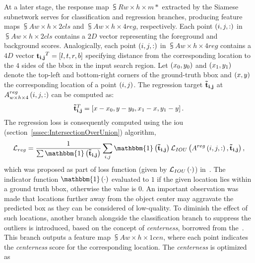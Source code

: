 At a later stage, the response map $\subsup{R}{w \times h \times m}{*}$ extracted by the Siamese subnetwork serves for classification and regression branches, producing feature maps $\subsup{A}{w \times h \times 2}{cls}$ and $\subsup{A}{w \times h \times 4}{reg}$, respectively. Each point $\left( {i, j, :} \right)$ in $\subsup{A}{w \times h \times 2}{cls}$ contains a $2D$ vector representing the foreground and background scores. Analogically, each point $\left( {i, j, :} \right)$ in $\subsup{A}{w \times h \times 4}{reg}$ contains a $4D$ vector ${\mathbf{t_{i, j}}}^T = \left[ {l, t, r, b} \right]$ specifying distance from the corresponding location to the $4$ sides of the \gls{bbox} in the input search region. Let $\left( {x_0, y_0} \right)$ and $\left( {x_1, y_1} \right)$ denote the top-left and bottom-right corners of the ground-truth \gls{bbox} and $\left( {x, y} \right)$ the corresponding location of a point $\left( {i, j} \right)$. The regression target $\mathbf{\tilde{t}_{i, j}}$ at ${A}_{w \times h \times 4}^{reg} \left( {i, j, :} \right)$ can be computed as:
\begin{equation}
    {\mathbf{\tilde{t}_{i, j}}}^T = \left[ {x - x_0, y - y_0, x_1 - x, y_1 - y} \right].
\end{equation}
The regression loss is consequently computed using the \gls{iou} (section~\ref{sssec:IntersectionOverUnion}) algorithm,
\begin{equation}
    \label{eq:SiamCARRegLoss}
    \mathcal{L}_{reg} =
    \frac{1}{\sum \func{\mathbbm{1}}{\vect{\tilde{t}_{i, j}}}}
    \sum_{i, j}
    \func{\mathbbm{1}}{\vect{\tilde{t}_{i, j}}}
    \func{\mathcal{L}_{IOU}}{\func{A^{reg}}{i, j, :}, \vect{\tilde{t}_{i, j}}},
\end{equation}
which was proposed as part of loss function (given by ${\mathcal{L}_{IOU}} \left( \cdot \right)$) in~\cite{yu2016unitbox}. The indicator function $\func{\mathbbm{1}}{\cdot}$ evaluated to $1$ if the given location lies within a ground truth \gls{bbox}, otherwise the value is $0$. An important observation was made that locations further away from the object center may aggravate the predicted box as they can be considered of low-quality. To diminish the effect of such locations, another branch alongside the classification branch to suppress the outliers is introduced, based on the concept of \emph{centerness}, borrowed from the~\cite{tian2019fcos}. This branch outputs a feature map $\subsup{A}{w \times h \times 1}{cen}$, where each point indicates the \emph{centerness} score for the corresponding location. The \emph{centerness} is optimized as

